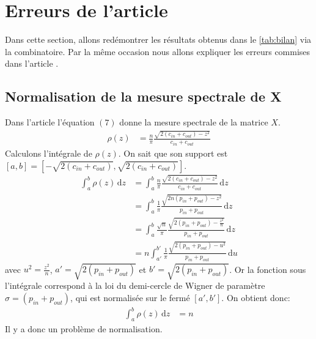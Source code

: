 \section{Erreurs de l'article}
Dans cette section, allons redémontrer les résultats obtenus dans le \autoref{tab:bilan} via la combinatoire.
Par la même occasion nous allons expliquer les erreurs commises dans l'article \cite[Graph spectra and the detectability of community structure in networks]{raj_rao}.
\subsection{Normalisation de la mesure spectrale de X}
Dans l'article l'équation $(7)$ donne la mesure spectrale de la matrice $X$.
\begin{align*}
	\rho(z) &= \frac{n}{\pi} \frac{\sqrt{2(c_{in} + c_{out}) - z^2}}{c_{in} + c_{out}}
\end{align*}
Calculons l'intégrale de $\rho(z)$. 
On sait que son support est $[a, b] = [-\sqrt{2(c_{in} + c_{out})},\sqrt{2(c_{in} + c_{out})}]$.
\begin{align*}
	\int_{a}^{b} \rho(z) \, \mathrm{d}z &= \int_{a}^{b} \frac{n}{\pi} \frac{\sqrt{2(c_{in} + c_{out}) - z^2}}{c_{in} + c_{out}}  \, \mathrm{d}z \\
	&= \int_{a}^{b} \frac{1}{\pi} \frac{\sqrt{2 n (p_{in} + p_{out}) - z^2}}{p_{in} + p_{out}}  \, \mathrm{d}z \\
	&= \int_{a}^{b} \frac{\sqrt{n}}{\pi} \frac{\sqrt{2 (p_{in} + p_{out}) - \frac{z^2}{n}}}{p_{in} + p_{out}}  \, \mathrm{d}z  \\
	&= n \int_{a'}^{b'} \frac{1}{\pi} \frac{\sqrt{2 (p_{in} + p_{out}) - u^2}}{p_{in} + p_{out}}  \, \mathrm{d}u  
\end{align*}
avec $u^2 = \frac{z^2}{n}$, $a'= \sqrt{2(p_{in} + p_{out})}$ et $b'= \sqrt{2(p_{in} + p_{out})}$.
Or la fonction sous l’intégrale correspond à la loi du demi-cercle de Wigner de paramètre $\sigma = (p_{in} + p_{out})$, qui est normalisée sur le fermé $[a', b']$.
On obtient donc:
\begin{align*}
 	\int_{a}^{b} \rho(z) \, \mathrm{d}z &= n
\end{align*}
Il y a donc un problème de normalisation.

